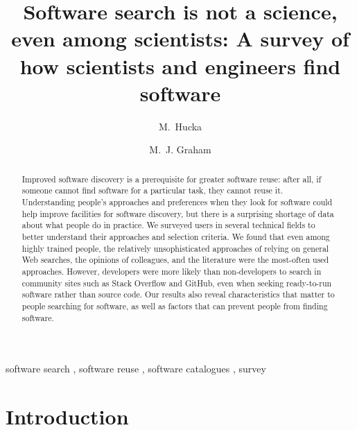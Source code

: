 \documentclass[review]{elsarticle}
\begin{document}
\begin{frontmatter}

\title{Software search is not a science, even among scientists: A survey of how scientists and engineers find software}

\author[cms]{M.~Hucka}
\author[astro]{M.~J. Graham}

\address[cms]{Department of Computing and Mathematical Sciences, Mail Code 306-15, California Institute of Technology, Pasadena, California 91125, USA}

\address[astro]{Department of Astronomy, Mail Code 158-79, California Institute of Technology, Pasadena, California 91125, USA}


\begin{abstract}
  Improved software discovery is a prerequisite for greater software reuse: after all, if someone cannot find software for a particular task, they cannot reuse it.  Understanding people's approaches and preferences when they look for software could help improve facilities for software discovery, but there is a surprising shortage of data about what people do in practice.  We surveyed users in several technical fields to better understand their approaches and selection criteria.  We found that even among highly trained people, the relatively unsophisticated approaches of relying on general Web searches, the opinions of colleagues, and the literature were the most-often used approaches.  However, developers were more likely than non-developers to search in community sites such as Stack Overflow and GitHub, even when seeking ready-to-run software rather than source code.  Our results also reveal characteristics that matter to people searching for software, as well as factors that can prevent people from finding software.
\end{abstract}

\begin{keyword}
software search \sep
software reuse \sep
software catalogues \sep
survey
\end{keyword}

\end{frontmatter}


\section{Introduction}
\end{document}
